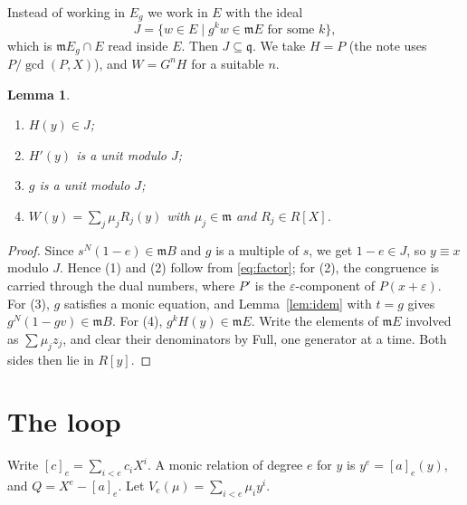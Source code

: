 \documentclass[11pt]{amsart}
\numberwithin{equation}{section}
\newtheorem{lemma}[theorem]{Lemma}
\theoremstyle{definition}
\theoremstyle{remark}
\newcommand{\m}{\mathfrak m}
\newcommand{\q}{\mathfrak q}
\begin{document}
Instead of working in $E_g$ we work in $E$ with the ideal
\[
 J=\{w\in E\mid g^kw\in\m E\text{ for some }k\},
\]
which is $\m E_g\cap E$ read inside $E$. Then $J\subseteq\q$. We take
$H=P$ (the note uses $P/\gcd(P,X)$), and $W=G^nH$ for a suitable $n$.

\begin{lemma}\label{lem:fibre}
\begin{enumerate}
\item $H(y)\in J$;
\item $H'(y)$ is a unit modulo $J$;
\item $g$ is a unit modulo $J$;
\item $W(y)=\sum_j\mu_jR_j(y)$ with $\mu_j\in\m$ and $R_j\in R[X]$.
\end{enumerate}
\end{lemma}
\begin{proof}
Since $s^N(1-e)\in\m B$ and $g$ is a multiple of $s$, we get $1-e\in J$,
so $y\equiv x$ modulo $J$. Hence (1) and (2) follow from
\eqref{eq:factor}; for (2), the congruence is carried through the dual
numbers, where $P'$ is the $\varepsilon$-component of $P(x+\varepsilon)$.
For (3), $g$ satisfies a monic equation, and Lemma~\ref{lem:idem} with
$t=g$ gives $g^N(1-gv)\in\m B$. For (4), $g^kH(y)\in\m E$. Write the
elements of $\m E$ involved as $\sum\mu_jz_j$, and clear their
denominators by Full, one generator at a time. Both sides then lie in
$R[y]$.
\end{proof}

\section{The loop}\label{sec:loop}

Write $[c]_e=\sum_{i<e}c_iX^i$. A monic relation of degree $e$ for $y$
is $y^e=[a]_e(y)$, and $Q=X^e-[a]_e$. Let $V_e(\mu)=\sum_{i<e}\mu_iy^i$.
\end{document}

